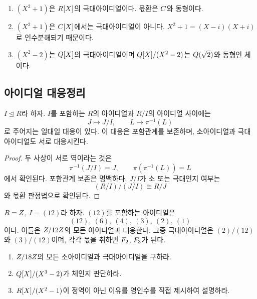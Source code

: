 \begin{example}
\begin{enumerate}[label=(\alph*)]
  \item $(X^2+1)$은 $R[X]$의 극대아이디얼이다. 몫환은 $C$와 동형이다.
  \item $(X^2+1)$은 $C[X]$에서는 극대아이디얼이 아니다. $X^2+1=(X-i)(X+i)$로 인수분해되기 때문이다.
  \item $(X^2-2)$는 $Q[X]$의 극대아이디얼이며 $Q[X]/(X^2-2)$는 $Q(\sqrt2)$와 동형인 체이다.
\end{enumerate}
\end{example}

\subsection{아이디얼 대응정리}

\begin{theorem}
$I\trianglelefteq R$라 하자. $I$를 포함하는 $R$의 아이디얼과 $R/I$의 아이디얼 사이에는
\[
  J\longmapsto J/I,\qquad
  L\longmapsto\pi^{-1}(L)
\]
로 주어지는 일대일 대응이 있다. 이 대응은 포함관계를 보존하며, 소아이디얼과 극대아이디얼도 서로 대응시킨다.
\end{theorem}

\begin{proof}
두 사상이 서로 역이라는 것은
\[
  \pi^{-1}(J/I)=J,\qquad \pi(\pi^{-1}(L))=L
\]
에서 확인된다. 포함관계 보존은 명백하다. $J/I$가 소 또는 극대인지 여부는
\[
  (R/I)/(J/I)\cong R/J
\]
와 몫환 판정법으로 확인된다.
\end{proof}

\begin{example}
$R=Z$, $I=(12)$라 하자. $(12)$를 포함하는 아이디얼은
\[
  (12),\ (6),\ (4),\ (3),\ (2),\ (1)
\]
이다. 이들은 $Z/12Z$의 모든 아이디얼과 대응한다. 그중 극대아이디얼은 $(2)/(12)$와 $(3)/(12)$이며, 각각 몫을 취하면 $F_2$, $F_3$가 된다.
\end{example}

\begin{checkpoint}
\begin{enumerate}[label=(\alph*)]
  \item $Z/18Z$의 모든 소아이디얼과 극대아이디얼을 구하라.
  \item $Q[X]/(X^3-2)$가 체인지 판단하라.
  \item $R[X]/(X^2-1)$이 정역이 아닌 이유를 영인수를 직접 제시하여 설명하라.
\end{enumerate}
\end{checkpoint}

